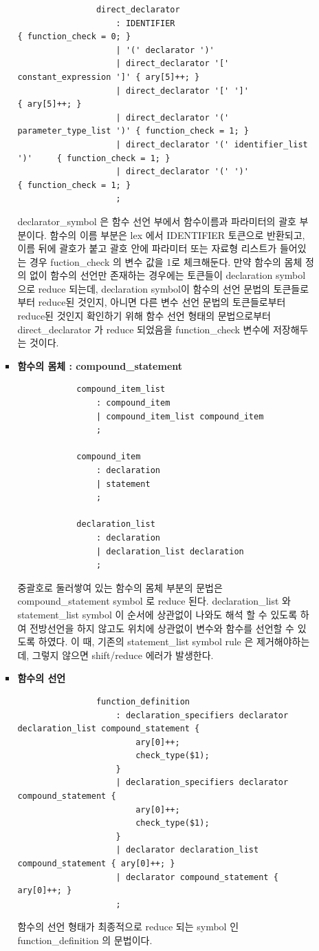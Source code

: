 \documentclass{article}
\begin{document}
\begin{itemize}
\begin{itemize}
\begin{itemize}
\begin{lstlisting}
				direct_declarator
					: IDENTIFIER									{ function_check = 0; }
					| '(' declarator ')'		
					| direct_declarator '[' constant_expression ']'	{ ary[5]++; }
					| direct_declarator '[' ']'						{ ary[5]++; }
					| direct_declarator '(' parameter_type_list ')' { function_check = 1; }
					| direct_declarator '(' identifier_list ')'		{ function_check = 1; }
					| direct_declarator '(' ')'						{ function_check = 1; }
					;
			\end{lstlisting}
			declarator\_symbol 은 함수 선언 부에서 함수이름과 파라미터의 괄호 부분이다.
			함수의 이름 부분은 lex 에서 IDENTIFIER 토큰으로 반환되고, 이름 뒤에 괄호가 붙고 괄호 안에 파라미터
			또는 자료형 리스트가 들어있는 경우 fuction\_check 의 변수 값을 1로 체크해둔다. 만약 함수의 몸체 정의 없이
			함수의 선언만 존재하는 경우에는 토큰들이 declaration symbol 으로 reduce 되는데, declaration symbol이
			함수의 선언 문법의 토큰들로 부터 reduce된 것인지, 아니면 다른 변수 선언 문법의 토큰들로부터 reduce된 것인지
			확인하기 위해 함수 선언 형태의 문법으로부터 direct\_declarator 가 reduce 되었음을 function\_check
			변수에 저장해두는 것이다.

			\item {\bf 함수의 몸체 : compound\_statement}
			\begin{lstlisting}
			compound_item_list
				: compound_item
				| compound_item_list compound_item
				;
			
			compound_item
				: declaration
				| statement
				;
			
			declaration_list
				: declaration
				| declaration_list declaration
				;
			\end{lstlisting}
			중괄호로 둘러쌓여 있는 함수의 몸체 부분의 문법은 compound\_statement symbol 로 reduce 된다.
			declaration\_list 와 statement\_list symbol 이 순서에 상관없이 나와도 해석 할 수 있도록 하여
			전방선언을 하지 않고도 위치에 상관없이 변수와 함수를 선언할 수 있도록 하였다. 이 때, 기존의 statement\_list
			symbol rule 은 제거해야하는데, 그렇지 않으면 shift/reduce 에러가 발생한다.

			\item {\bf 함수의 선언}
			\begin{lstlisting}
				function_definition
					: declaration_specifiers declarator declaration_list compound_statement {
						ary[0]++;
						check_type($1);
					}
					| declaration_specifiers declarator compound_statement {
						ary[0]++;
						check_type($1);
					}
					| declarator declaration_list compound_statement { ary[0]++; }
					| declarator compound_statement	{ ary[0]++; }
					;
			\end{lstlisting}
			함수의 선언 형태가 최종적으로 reduce 되는 symbol 인 function\_definition 의 문법이다.
		

\end{itemize}
\end{itemize}
\end{itemize}
\end{document}
